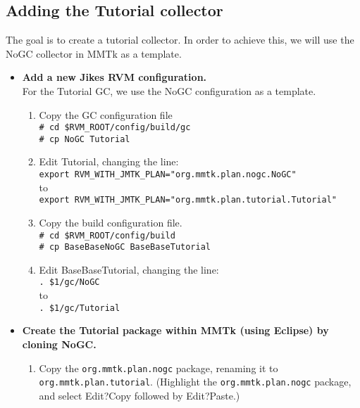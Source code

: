 \documentclass[textsize=14pt]{article}
\newcommand{\cmd}[1]{\texttt{\# #1}}
\newcommand{\shline}[1]{\texttt{#1}}
\newcommand{\code}[1]{\texttt{#1}}
\newcommand{\file}[1]{\textsf{#1}}
\newcommand{\menu}[0]{?}
\begin{document}
\subsection{Adding the Tutorial collector}

The goal is to create a tutorial collector. In order to achieve
this, we will use the NoGC collector in MMTk as a template.

\begin{itemize}
\item \textbf{Add a new Jikes RVM configuration.} \\
    For the Tutorial GC, we use the NoGC configuration as a
    template.
    \begin{enumerate}
    \item Copy the GC configuration file \\
    \cmd{cd \$RVM\_ROOT/config/build/gc} \\
    \cmd{cp NoGC Tutorial}

    \item Edit \file{Tutorial}, changing the line: \\
    \shline{export RVM\_WITH\_JMTK\_PLAN="org.mmtk.plan.nogc.NoGC"} \\ to \\
    \shline{export RVM\_WITH\_JMTK\_PLAN="org.mmtk.plan.tutorial.Tutorial"}

    \item Copy the build configuration file. \\
    \cmd{cd \$RVM\_ROOT/config/build} \\
    \cmd{cp BaseBaseNoGC BaseBaseTutorial}

    \item Edit \file{BaseBaseTutorial}, changing the line: \\
    \shline{. \$1/gc/NoGC} \\ to \\
    \shline{. \$1/gc/Tutorial}

    \end{enumerate}

\item \textbf{Create the Tutorial package within MMTk (using Eclipse) by cloning NoGC.}
    \begin{enumerate}
    \item Copy the \code{org.mmtk.plan.nogc} package, renaming it to
    \code{org.mmtk.plan.tutorial}. (Highlight the \code{org.mmtk.plan.nogc} package, and
    select Edit\menu{}Copy followed by Edit\menu{}Paste.)


\end{enumerate}
\end{itemize}
\end{document}
